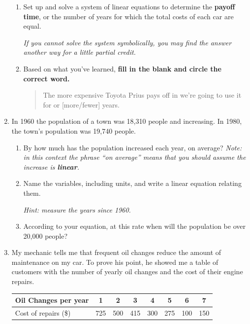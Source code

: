 \documentclass[12pt]{article}
\begin{document}
\begin{enumerate}
\begin{enumerate}
\item Set up and solve a system of linear equations to determine the \textbf{payoff time}, or the number of years for which the total costs of each car are equal.

\emph{If you cannot solve the system symbolically, you may find the answer another way for a little partial credit.}
\vfill

\item Based on what you've learned, \textbf{fill in the blank and circle the correct word.}

\begin{quote}
The more expensive Toyota Prius pays off in we're going to use it for \hrulefill   or [more/fewer] years.  
\end{quote}

\end{enumerate}
\newpage



\item In 1960 the population of a town was 18,310 people and increasing.  In 1980, the town's population was 19,740 people.

\begin{enumerate}
\item By how much has the population increased each year, on average?  \emph{Note:  in this context the phrase ``on average'' means that you should assume the increase is \textbf{linear}.}
\vfill
\item Name the variables, including units, and write a linear equation relating them.

\emph{Hint:  measure the years since 1960.}
\vfill
\item According to your equation, at this rate when will the population be over 20,000 people?
\vfill
\end{enumerate}
\newpage %

\item My mechanic tells me that frequent oil changes reduce the amount of maintenance on my car.  To prove his point, he showed me a table of customers with the number of yearly oil changes and the cost of their engine repairs.

\begin{center}
\begin{tabular} {|l|c|c |c|c|c|c|c|}  \hline
Oil Changes per year & 1 & 2 & 3 & 4 & 5 & 6 & 7  \\ \hline
Cost of repairs (\$) & 725 & 500 & 415 & 300 & 275 & 100 & 150  \\ \hline
\end{tabular}
\end{center}


\end{enumerate}
\end{document}
